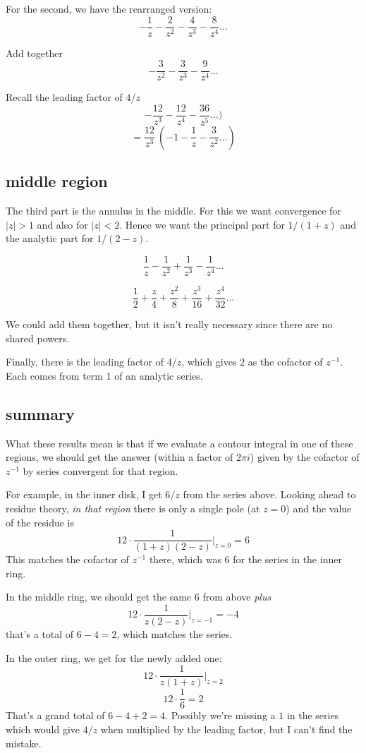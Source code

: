 \documentclass[11pt, oneside]{article}
\begin{document}
For the second, we have the rearranged version:
\[ - \frac{1}{z} - \frac{2}{z^2} - \frac{4}{z^3}  - \frac{8}{z^4} \dots \]

Add together
\[ -\frac{3}{z^2} - \frac{3}{z^3} - \frac{9}{z^4} \dots \]

Recall the leading factor of $4/z$
\[ - \frac{12}{z^3} - \frac{12}{z^4} - \frac{36}{z^5} \dots )  \]
\[ = \frac{12}{z^3} \ (-1 -\frac{1}{z} - \frac{3}{z^2} \dots )\]

\subsection*{middle region}

The third part is the annulus in the middle.  For this we want convergence for $|z| > 1$ and also for $|z| < 2$.  Hence we want the principal part for $1/(1+z)$ and the analytic part for $1/(2-z)$.

\[ \frac{1}{z} - \frac{1}{z^2} + \frac{1}{z^3}  - \frac{1}{z^4} \dots \]

\[ \frac{1}{2} + \frac{z}{4} + \frac{z^2}{8}  + \frac{z^3}{16} + \frac{z^4}{32} \dots \]

We could add them together, but it isn't really necessary since there are no shared powers.

Finally, there is the leading factor of $4/z$, which gives $2$ as the cofactor of $z^{-1}$.  Each comes from term 1 of an analytic series.

\subsection*{summary}

What these results mean is that if we evaluate a contour integral in one of these regions, we should get the answer (within a factor of $2 \pi i$) given by the cofactor of $z^{-1}$ by series convergent for that region.

For example, in the inner disk, I get $6/z$ from the series above.  Looking ahead to residue theory, \emph{in that region} there is only a single pole (at $z = 0$) and the value of the residue is
\[ 12 \cdot \frac{1}{(1+z)(2-z)} \bigg |_{z=0} = 6 \]
This matches the cofactor of $z^{-1}$ there, which was $6$ for the series in the inner ring.

In the middle ring, we should get the same $6$ from above \emph{plus}
\[ 12 \cdot \frac{1}{z(2-z)} \bigg |_{z=-1} = - 4 \]
that's a total of $6 - 4 = 2$, which matches the series.

In the outer ring, we get for the newly added one:
\[ 12 \cdot \frac{1}{z(1+z)} \bigg |_{z=2} \]
\[ 12 \cdot \frac{1}{6} = 2 \]
That's a grand total of $6 - 4 + 2 = 4$.  Possibly we're missing a $1$ in the series which would give $4/z$ when multiplied by the leading factor, but I can't find the mistake.
\end{document}
